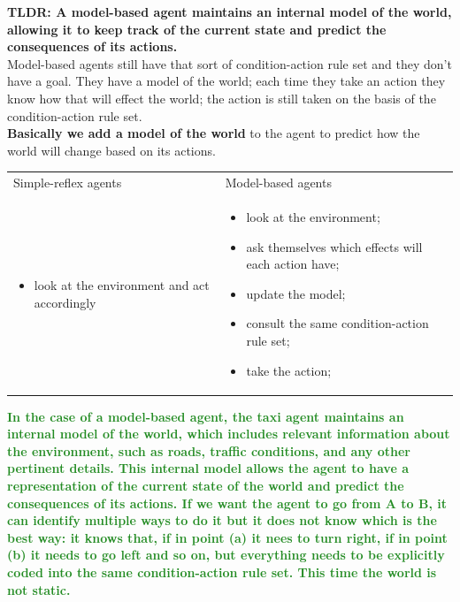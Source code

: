 \documentclass{article}
\begin{document}
\textbf{TLDR: A model-based agent maintains an internal model of the world, allowing it to keep track of the current state and predict the consequences of its actions.} \\

Model-based agents still have that sort of condition-action rule set and they don't have a goal. They have a model of the world; each time they take an action they know how that will effect the world; the action is still taken on the basis of the condition-action rule set. \\

\textbf{Basically we add a model of the world} to the agent to predict how the world will change based on its actions.

\begin{center}
    \begin{tabular}{p{}|p{}}
    
        Simple-reflex agents & Model-based agents \\
        
        \begin{itemize}
            \item look at the environment and act accordingly
        \end{itemize} & 
        \begin{itemize}
            \item look at the environment;
            \item ask themselves which effects will each action have;
            \item update the model;
            \item consult the same condition-action rule set;
            \item take the action;
        \end{itemize} 
    \end{tabular}
\end{center}

\newpage

\textcolor{ForestGreen}{\textbf{
    In the case of a model-based agent, the taxi agent maintains an internal model of the world, which includes relevant information about the environment, such as roads, traffic conditions, and any other pertinent details. This internal model allows the agent to have a representation of the current state of the world and predict the consequences of its actions.
    If we want the agent to go from A to B, it can identify multiple ways to do it but it does not know which is the best way: it knows that, if in point (a) it nees to turn right, if in point (b) it needs to go left and so on, but everything needs to be explicitly coded into the same condition-action rule set. This time the world is not static.
}}
\end{document}
